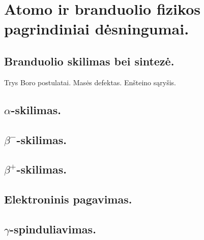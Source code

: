 \chapter{Atomo ir branduolio fizikos pagrindiniai dėsningumai.}
\section{Branduolio skilimas bei sintezė.}
Trys Boro postulatai. Masės defektas. Enšteino sąryšis.
\section{$\alpha$-skilimas.}
\section{$\beta^{-}$-skilimas.}
\section{$\beta^{+}$-skilimas.}
\section{Elektroninis pagavimas.}
\section{$\gamma$-spinduliavimas.}
